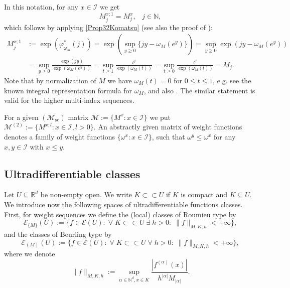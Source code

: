 \documentclass[10pt]{amsart}%
\numberwithin{equation}{section}
\theoremstyle{plain}
\newcommand{\RR}{\mathbb{R}}
\newcommand{\NN}{\mathbb{N}}
\begin{document}
In this notation, for any $x\in\mathcal{I}$ we get
\begin{equation}\label{Mxonestable}
M^{x;1}_j=M^x_j,\;\;\;j\in\NN,
\end{equation}
which follows by applying \eqref{Prop32Komatsu} (see also the proof of \cite[Thm. 6.4]{testfunctioncharacterization}):
     \begin{align*}
     M^{x;1}_j&:=\exp(\varphi^{*}_{\omega_{M}}(j))=\exp(\sup_{y\ge 0}\{jy-\omega_{M}(e^y)\})=\sup_{y\ge 0}\exp(jy-\omega_{M}(e^y))
     \\&
     =\sup_{y\ge 0}\frac{\exp(jy)}{\exp(\omega_{M}(e^y))}=\sup_{t\ge 1}\frac{t^j}{\exp(\omega_{M}(t))}=\sup_{t\ge 0}\frac{t^j}{\exp(\omega_{M}(t))}=M_j.
     \end{align*}
     Note that by normalization of $M$ we have $\omega_{M}(t)=0$ for $0\le t\le 1$, e.g. see the known integral representation formula for $\omega_M$, \cite[1.8. III]{mandelbrojtbook} and also \cite[$(3.11)$]{Komatsu73}. The similar statement is valid for the higher multi-index sequences.\vspace{6pt}

For a given \hyperlink{Msc}{$(\mathcal{M}_{\text{sc}})$} matrix $\mathcal{M}:=\{M^x: x\in\mathcal{I}\}$ we put $\mathcal{M}^{(2)}:=\{M^{x;l}: x\in\mathcal{I}, l>0\}$. An abstractly given matrix of weight functions denotes a family of weight functions $\{\omega^x: x\in\mathcal{I}\}$, such that $\omega^y\le\omega^x$ for any $x,y\in\mathcal{I}$ with $x\le y$.

\subsection{Ultradifferentiable classes}\label{classes}
Let $U\subseteq\RR^d$ be non-empty open. We write $K\subset\subset U$ if $K$ is compact and $K\subseteq U$. We introduce now the following spaces of ultradifferentiable functions classes.
First, for weight sequences we define the (local) classes of Roumieu type by
$$\mathcal{E}_{\{M\}}(U):=\{f\in\mathcal{E}(U):\;\forall\;K\subset\subset U\;\exists\;h>0:\;\|f\|_{M,K,h}<+\infty\},$$
and the classes of Beurling type by
$$\mathcal{E}_{(M)}(U):=\{f\in\mathcal{E}(U):\;\forall\;K\subset\subset U\;\forall\;h>0:\;\|f\|_{M,K,h}<+\infty\},$$
where we denote
\begin{equation*}%
\|f\|_{M,K,h}:=\sup_{\alpha\in\NN^d,x\in K}\frac{|f^{(\alpha)}(x)|}{h^{|\alpha|} M_{|\alpha|}}.
\end{equation*}
\end{document}
